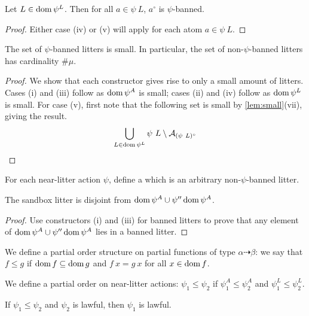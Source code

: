 \begin{lemma}
    Let \( L \in \operatorname{dom} \psi^L \).
    Then for all \( a \in \psi\ L \), \( a^\circ \) is \( \psi \)-banned.
\end{lemma}
\begin{proof}
    Either case (iv) or (v) will apply for each atom \( a \in \psi\ L \).
\end{proof}
\begin{lemma}
    \label{lem:bannedLitter_small}
    The set of \( \psi \)-banned litters is small.
    In particular, the set of non-\( \psi \)-banned litters has cardinality \( \#\mu \).
\end{lemma}
\begin{proof}
    We show that each constructor gives rise to only a small amount of litters.
    Cases (i) and (iii) follow as \( \operatorname{dom} \psi^A \) is small; cases (ii) and (iv) follow as \( \operatorname{dom} \psi^L \) is small.
    For case (v), first note that the following set is small by \cref{lem:small}(vii), giving the result.
    \[ \bigcup_{L \in \operatorname{dom} \psi^L} \psi\ L \setminus \mathcal A_{(\psi\ L)^\circ} \]
\end{proof}
\begin{definition}
    For each near-litter action \( \psi \), define a  which is an arbitrary non-\( \psi \)-banned litter.
\end{definition}
\begin{lemma}
    The sandbox litter is disjoint from \( \operatorname{dom} \psi^A \cup \psi '' \operatorname{dom} \psi^A \).
\end{lemma}
\begin{proof}
    Use constructors (i) and (iii) for banned litters to prove that any element of \( \operatorname{dom} \psi^A \cup \psi '' \operatorname{dom} \psi^A \) lies in a banned litter.
\end{proof}
\begin{definition}
    We define a partial order structure on partial functions of type \( \alpha \rightdasharrow \beta \): we say that \( f \leq g \) if \( \operatorname{dom} f \subseteq \operatorname{dom} g \) and \( f\ x = g\ x \) for all \( x \in \operatorname{dom} f \).
\end{definition}
\begin{definition}
    We define a partial order on near-litter actions: \( \psi_1 \leq \psi_2 \) if \( \psi_1^A \leq \psi_2^A \) and \( \psi_1^L \leq \psi_2^L \).
\end{definition}
\begin{lemma}
    \label{lem:NearLitterAction.Lawful.le}
    If \( \psi_1 \leq \psi_2 \) and \( \psi_2 \) is lawful, then \( \psi_1 \) is lawful.
\end{lemma}
